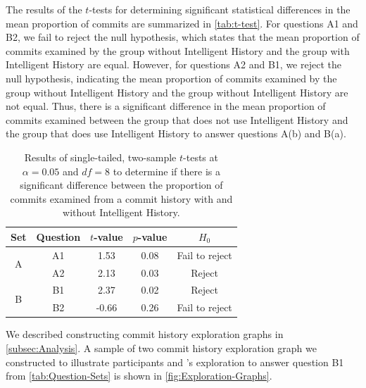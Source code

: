 The results of the $t$-tests for determining significant statistical differences in the mean proportion of commits are summarized in \autoref{tab:t-test}.
For questions A1 and B2, we fail to reject the null hypothesis, which states that the mean proportion of commits examined by the group without Intelligent History and the group with Intelligent History are equal.
However, for questions A2 and B1, we reject the null hypothesis, indicating the mean proportion of commits examined by the group without Intelligent History and the group without Intelligent History are not equal.
Thus, there is a significant difference in the mean proportion of commits examined between the group that does not use Intelligent History and the group that does use Intelligent History to answer questions A(b) and B(a).

\begin{table}[h]
  \caption{
    Results of single-tailed, two-sample $t$-tests at $\alpha = 0.05$ and $df = 8$ to determine if there is a significant difference between the proportion of commits examined from a commit history
    with and without Intelligent History.
  }
  \centering
  \begin{tabular}{@{}ccccc@{}}
    \toprule
    Set                                     & Question               & \multicolumn{1}{c}{$t$-value} & \multicolumn{1}{c}{$p$-value} & $H_{0}$ \\ \midrule
    \multicolumn{1}{c|}{\multirow{2}{*}{A}} & \multicolumn{1}{c|}{A1} & 1.53                        & 0.08                        & Fail to reject   \\ \cmidrule(l){2-5} 
    \multicolumn{1}{c|}{}                   & \multicolumn{1}{c|}{A2} & 2.13                        & 0.03                        & Reject   \\ \midrule
    \multicolumn{1}{c|}{\multirow{2}{*}{B}} & \multicolumn{1}{c|}{B1} & 2.37                        & 0.02                        & Reject   \\ \cmidrule(l){2-5} 
    \multicolumn{1}{c|}{}                   & \multicolumn{1}{c|}{B2} & -0.66                       & 0.26                        & Fail to reject   \\ \bottomrule
  \end{tabular}
  \label{tab:t-test}
\end{table}

We described constructing commit history exploration graphs in \autoref{subsec:Analysis}. 
A sample of two commit history exploration graph we constructed to illustrate participants  and ’s exploration to answer question B1 from \autoref{tab:Question-Sets} is shown in \autoref{fig:Exploration-Graphs}.

